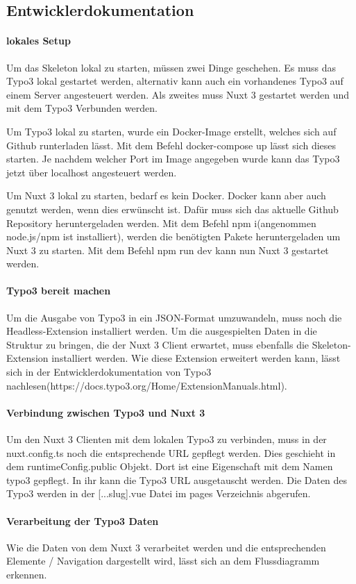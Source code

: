 \subsection{Entwicklerdokumentation}
\label{app:Doc}

\paragraph{lokales Setup}

Um das Skeleton lokal zu starten, müssen zwei Dinge geschehen. Es muss das Typo3 lokal gestartet werden, alternativ kann auch ein vorhandenes Typo3 auf einem Server angesteuert werden. Als zweites muss Nuxt 3 gestartet werden und mit dem Typo3 Verbunden werden. 

Um Typo3 lokal zu starten, wurde ein Docker-Image erstellt, welches sich auf Github runterladen lässt. Mit dem Befehl docker-compose up lässt sich dieses starten. Je nachdem welcher Port im Image angegeben wurde kann das Typo3 jetzt über localhost angesteuert werden.

Um Nuxt 3 lokal zu starten, bedarf es kein Docker. Docker kann aber auch genutzt werden, wenn dies erwünscht ist. Dafür muss sich das aktuelle Github Repository heruntergeladen werden. Mit dem Befehl npm i(angenommen node.js/npm ist installiert), werden die benötigten Pakete heruntergeladen um Nuxt 3 zu starten. Mit dem Befehl npm run dev kann nun Nuxt 3 gestartet werden.

\paragraph{Typo3 bereit machen}

Um die Ausgabe von Typo3 in ein JSON-Format umzuwandeln, muss noch die Headless-Extension installiert werden. Um die ausgespielten Daten in die Struktur zu bringen, die der Nuxt 3 Client erwartet, muss ebenfalls die Skeleton-Extension installiert werden. Wie diese Extension erweitert werden kann, lässt sich in der Entwicklerdokumentation von Typo3 nachlesen(https://docs.typo3.org/Home/ExtensionManuals.html).

\paragraph{Verbindung zwischen Typo3 und Nuxt 3}

Um den Nuxt 3 Clienten mit dem lokalen Typo3 zu verbinden, muss in der nuxt.config.ts noch die entsprechende URL gepflegt werden. Dies geschieht in dem runtimeConfig.public Objekt. Dort ist eine Eigenschaft mit dem Namen typo3 gepflegt. In ihr kann die Typo3 URL ausgetauscht werden. Die Daten des Typo3 werden in der [...slug].vue Datei im pages Verzeichnis abgerufen.

\paragraph{Verarbeitung der Typo3 Daten}

Wie die Daten von dem Nuxt 3 verarbeitet werden und die entsprechenden Elemente / Navigation dargestellt wird, lässt sich an dem Flussdiagramm erkennen.
